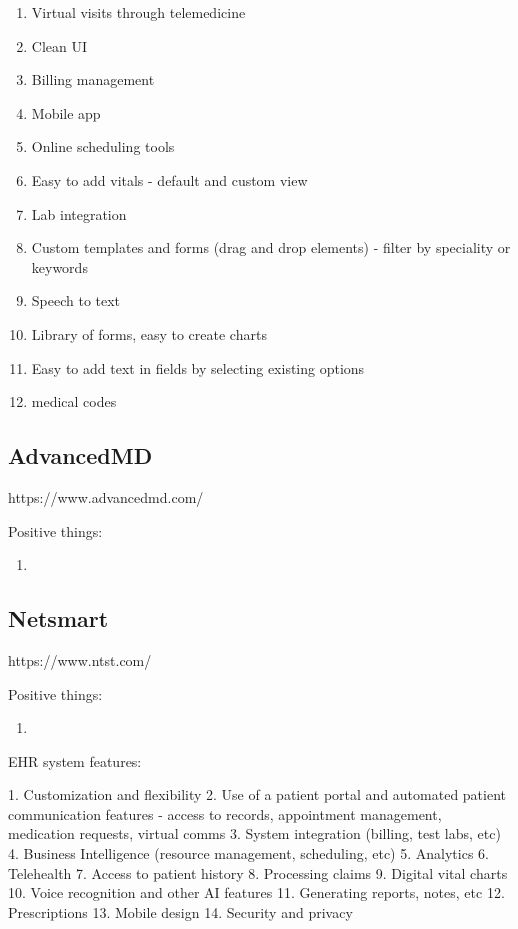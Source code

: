 \begin{enumerate}
    \item Virtual visits through telemedicine
    \item Clean UI
    \item Billing management
    \item Mobile app
    \item Online scheduling tools
    \item Easy to add vitals - default and custom view
    \item Lab integration
    \item Custom templates and forms (drag and drop elements) - filter by speciality or keywords
    \item Speech to text 
    \item Library of forms, easy to create charts
    \item Easy to add text in fields by selecting existing options
    \item medical codes 
\end{enumerate}

\subsection{AdvancedMD}

https://www.advancedmd.com/

Positive things:

\begin{enumerate}
    \item 
\end{enumerate}

\subsection{Netsmart}

https://www.ntst.com/

Positive things:

\begin{enumerate}
    \item 
\end{enumerate}


EHR system features:

1. Customization and flexibility
2. Use of a patient portal and automated patient communication features - access to records, appointment management, medication requests, virtual comms
3. System integration (billing, test labs, etc)
4. Business Intelligence (resource management, scheduling, etc)
5. Analytics
6. Telehealth
7. Access to patient history
8. Processing claims
9. Digital vital charts
10. Voice recognition and other AI features
11. Generating reports, notes, etc
12. Prescriptions
13. Mobile design
14. Security and privacy
